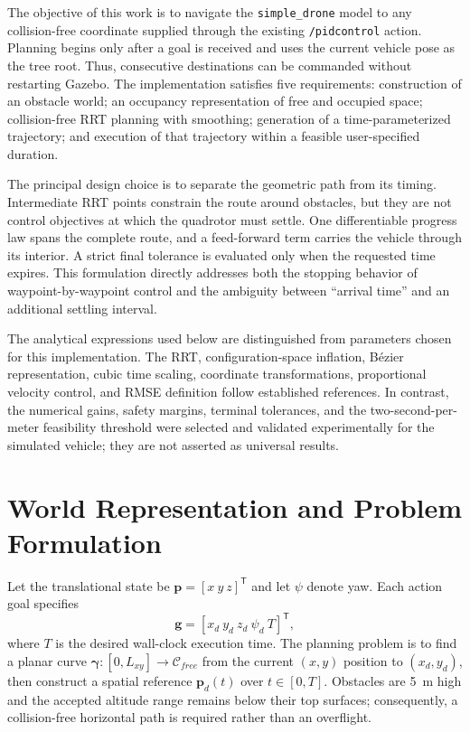 \documentclass[conference]{IEEEtran}
\begin{document}
The objective of this work is to navigate the \texttt{simple\_drone} model to
any collision-free coordinate supplied through the existing
\texttt{/pidcontrol} action. Planning begins only after a goal is received and
uses the current vehicle pose as the tree root. Thus, consecutive destinations
can be commanded without restarting Gazebo. The implementation satisfies five
requirements: construction of an obstacle world; an occupancy representation
of free and occupied space; collision-free RRT planning with smoothing;
generation of a time-parameterized trajectory; and execution of that trajectory
within a feasible user-specified duration.

The principal design choice is to separate the geometric path from its timing.
Intermediate RRT points constrain the route around obstacles, but they are not
control objectives at which the quadrotor must settle. One differentiable
progress law spans the complete route, and a feed-forward term carries the
vehicle through its interior. A strict final tolerance is evaluated only when
the requested time expires. This formulation directly addresses both the
stopping behavior of waypoint-by-waypoint control and the ambiguity between
``arrival time'' and an additional settling interval.

The analytical expressions used below are distinguished from parameters chosen
for this implementation. The RRT, configuration-space inflation, B\'ezier
representation, cubic time scaling, coordinate transformations, proportional
velocity control, and RMSE definition follow established references. In
contrast, the numerical gains, safety margins, terminal tolerances, and the
two-second-per-meter feasibility threshold were selected and validated
experimentally for the simulated vehicle; they are not asserted as universal
results.

\section{World Representation and Problem Formulation}

Let the translational state be
$\mathbf{p}=[x\ y\ z]^\mathsf{T}$ and let $\psi$ denote yaw. Each action goal
specifies
\begin{equation}
  \mathbf{g}=[x_d\ y_d\ z_d\ \psi_d\ T]^\mathsf{T},
\end{equation}
where $T$ is the desired wall-clock execution time. The planning problem is to
find a planar curve $\boldsymbol{\gamma}:[0,L_{xy}]\rightarrow\mathcal{C}_{free}$
from the current $(x,y)$ position to $(x_d,y_d)$, then construct a spatial
reference $\mathbf{p}_d(t)$ over $t\in[0,T]$. Obstacles are 5~m high and the
accepted altitude range remains below their top surfaces; consequently, a
collision-free horizontal path is required rather than an overflight.
\end{document}
